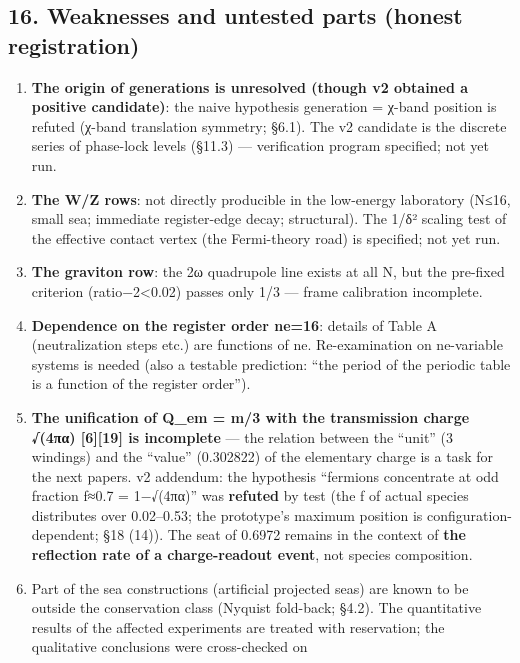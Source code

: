 \documentclass[
]{article}
\providecommand{\tightlist}{%
  \setlength{\itemsep}{0pt}\setlength{\parskip}{0pt}}
\begin{document}
\subsection{16. Weaknesses and untested parts (honest
registration)}\label{weaknesses-and-untested-parts-honest-registration}

\begin{enumerate}
\def\labelenumi{\arabic{enumi}.}
\tightlist
\item
  \textbf{The origin of generations is unresolved (though v2 obtained a
  positive candidate)}: the naive hypothesis generation = χ-band
  position is refuted (χ-band translation symmetry; §6.1). The v2
  candidate is the discrete series of phase-lock levels (§11.3) ---
  verification program specified; not yet run.
\item
  \textbf{The W/Z rows}: not directly producible in the low-energy
  laboratory (N≤16, small sea; immediate register-edge decay;
  structural). The 1/δ² scaling test of the effective contact vertex
  (the Fermi-theory road) is specified; not yet run.
\item
  \textbf{The graviton row}: the 2ω quadrupole line exists at all N, but
  the pre-fixed criterion (\textbar ratio−2\textbar\textless0.02) passes
  only 1/3 --- frame calibration incomplete.
\item
  \textbf{Dependence on the register order ne=16}: details of Table A
  (neutralization steps etc.) are functions of ne. Re-examination on
  ne-variable systems is needed (also a testable prediction: ``the
  period of the periodic table is a function of the register order'').
\item
  \textbf{The unification of Q\_em = m/3 with the transmission charge
  √(4πα) {[}6{]}{[}19{]} is incomplete} --- the relation between the
  ``unit'' (3 windings) and the ``value'' (0.302822) of the elementary
  charge is a task for the next papers. v2 addendum: the hypothesis
  ``fermions concentrate at odd fraction f≈0.7 = 1−√(4πα)'' was
  \textbf{refuted} by test (the f of actual species distributes over
  0.02--0.53; the prototype's maximum position is
  configuration-dependent; §18 (14)). The seat of 0.6972 remains in the
  context of \textbf{the reflection rate of a charge-readout event}, not
  species composition.
\item
  Part of the sea constructions (artificial projected seas) are known to
  be outside the conservation class (Nyquist fold-back; §4.2). The
  quantitative results of the affected experiments are treated with
  reservation; the qualitative conclusions were cross-checked on

\end{enumerate}
\end{document}
